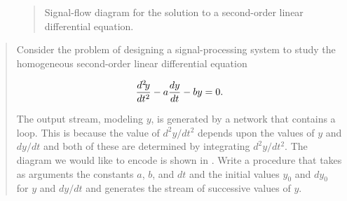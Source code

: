 \begin{figure}[tb]
\label{Figure 3.35}
\centering
\begin{comment}
\heading{Figure 3.35:} Signal-flow diagram for the solution to a second-order linear differential equation.

\begin{example}
               dy_0                y_0
                |                   |
                V                   V
   ddy     +----------+    dy  +----------+    y
+--------->| integral +-----*--+ integral +--*--->
|          +----------+     |  +----------+  |
|                           |                |
|            +----------+   |                |
|     __/|<--+ scale: a |<--+                |
|   _/   |   +----------+                    |
+--<_add |                                   |
     \__ |   +----------+                    |
        \|<--+ scale: b |<-------------------+
             +----------+
\end{example}
\end{comment}

\begin{quote}
 Signal-flow diagram for the solution to a second-order linear differential equation.
\end{quote}
\end{figure}

\begin{quote}
 Consider the problem of designing
a signal-processing system to study the homogeneous second-order linear
differential equation
\begin{comment}

\begin{example}
d^2 y        d y
-----  -  a -----  -  by  =  0
d t^2        d t
\end{example}

\end{comment}

$$ {d^2\!y \over dt^2} - a {dy \over dt} - by = 0. $$

The output stream, modeling \( y \), is generated by a network that contains a
loop. This is because the value of \( d^2\!y / dt^2 \) depends upon the
values of \( y \) and \( dy / dt \) and both of these are determined by
integrating \( d^2\!y / dt^2 \).  The diagram we would like to encode is
shown in .  Write a procedure  that takes as
arguments the constants \( a \), \( b \), and \( dt \) and the initial values
\( y_0 \) and \( dy_0 \) for \( y \) and \( dy / dt \) and generates the
stream of successive values of \( y \).
\end{quote}

